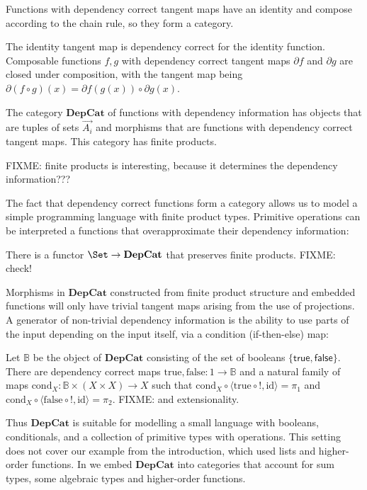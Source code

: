 Functions with dependency correct tangent maps have an identity
and compose according to the chain rule, so they form a category.

\newcommand{\DepCat}{\mathbf{DepCat}}

\begin{proposition}
  The identity tangent map is dependency correct for the identity
  function. Composable functions $f, g$ with dependency correct
  tangent maps $\partial f$ and $\partial g$ are closed under
  composition, with the tangent map being
  $\partial(f \circ g)(x) = \partial f (g(x)) \circ \partial g(x)$.

  The category $\DepCat$ of functions with dependency information
  has objects that are tuples of sets $\overrightarrow{A_i}$ and
  morphisms that are functions with dependency correct tangent
  maps. This category has finite products.
\end{proposition}

FIXME: finite products is interesting, because it determines the
dependency information???

The fact that dependency correct functions form a category allows us
to model a simple programming language with finite product
types. Primitive operations can be interpreted a functions that
overapproximate their dependency information:

\begin{proposition}
  There is a functor $\Set \to \DepCat$ that preserves finite
  products. FIXME: check!
\end{proposition}

Morphisms in $\DepCat$ constructed from finite product structure and
embedded functions will only have trivial tangent maps arising from
the use of projections. A generator of non-trivial dependency
information is the ability to use parts of the input depending on
the input itself, via a condition (if-then-else) map:

\begin{proposition}
  Let $\mathbb{B}$ be the object of $\DepCat$ consisting of the set
  of booleans $\{\mathsf{true}, \mathsf{false}\}$. There are
  dependency correct maps
  $\mathrm{true}, \mathrm{false} : 1 \to \mathbb{B}$ and a natural
  family of maps
  $\mathrm{cond}_X : \mathbb{B} \times (X \times X) \to X$ such that $\mathrm{cond}_X \circ \langle \mathrm{true} \circ !, \mathrm{id} \rangle = \pi_1$ and $\mathrm{cond}_X \circ \langle \mathrm{false} \circ !, \mathrm{id} \rangle = \pi_2$. FIXME: and extensionality.
\end{proposition}

Thus $\DepCat$ is suitable for modelling a small language with
booleans, conditionals, and a collection of primitive types with
operations. This setting does not cover our example from the
introduction, which used lists and higher-order functions. In
 we embed $\DepCat$ into
categories that account for sum types, some algebraic types and
higher-order functions.
